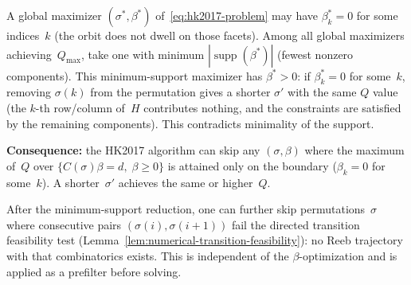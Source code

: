\begin{remark}\label{rem:min-support}
A global maximizer $(\sigma^*, \beta^*)$
of~\eqref{eq:hk2017-problem}
may have $\beta^*_k = 0$ for some indices~$k$
(the orbit does not dwell on those facets).
Among all global maximizers achieving~$Q_{\max}$,
take one with minimum $|\operatorname{supp}(\beta^*)|$
(fewest nonzero components).
This minimum-support maximizer has $\beta^* > 0$:
if $\beta^*_k = 0$ for some~$k$, removing $\sigma(k)$
from the permutation gives a shorter $\sigma'$ with the same
$Q$ value (the $k$-th row/column of~$H$ contributes nothing,
and the constraints are satisfied by the remaining components).
This contradicts minimality of the support.

\textbf{Consequence:} the HK2017 algorithm can skip any
$(\sigma, \beta)$ where the maximum of~$Q$ over
$\{C(\sigma)\beta = d,\; \beta \geq 0\}$
is attained only on the boundary ($\beta_k = 0$ for some~$k$).
A shorter~$\sigma'$ achieves the same or higher~$Q$.
\end{remark}

\begin{remark}\label{rem:adjacency-pruning}
After the minimum-support reduction, one can further skip
permutations~$\sigma$ where consecutive pairs
$(\sigma(i), \sigma(i{+}1))$ fail the directed transition
feasibility test (Lemma~\ref{lem:numerical-transition-feasibility}):
no Reeb trajectory with that combinatorics exists.
This is independent of the $\beta$-optimization and is applied
as a prefilter before solving.
\end{remark}




